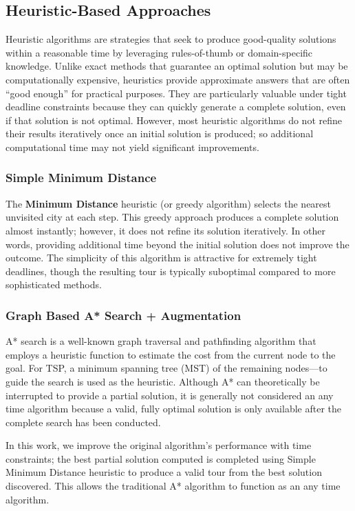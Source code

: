 \documentclass[11pt]{article}
\begin{document}
	\subsection{Heuristic-Based Approaches}
	Heuristic algorithms are strategies that seek to produce good-quality solutions within a reasonable time by leveraging rules-of-thumb or domain-specific knowledge. Unlike exact methods that guarantee an optimal solution but may be computationally expensive, heuristics provide approximate answers that are often “good enough” for practical purposes. They are particularly valuable under tight deadline constraints because they can quickly generate a complete solution, even if that solution is not optimal. However, most heuristic algorithms do not refine their results iteratively once an initial solution is produced; so additional computational time may not yield significant improvements.
	
	\subsubsection{Simple Minimum Distance}
	The \textbf{Minimum Distance} heuristic (or greedy algorithm) selects the nearest unvisited city at each step. This greedy approach produces a complete solution almost instantly; however, it does not refine its solution iteratively. In other words, providing additional time beyond the initial solution does not improve the outcome. The simplicity of this algorithm is attractive for extremely tight deadlines, though the resulting tour is typically suboptimal compared to more sophisticated methods.
	
	\subsubsection{Graph Based A* Search + Augmentation}
	A* search is a well-known graph traversal and pathfinding algorithm \cite{4082128} that employs a heuristic function to estimate the cost from the current node to the goal. For TSP, a minimum spanning tree (MST) of the remaining nodes—to guide the search is used as the heuristic. Although A* can theoretically be interrupted to provide a partial solution, it is generally not considered an any time algorithm because a valid, fully optimal solution is only available after the complete search has been conducted. 
	
	In this work, we improve the original algorithm's performance with time constraints; the best partial solution computed is completed using Simple Minimum Distance heuristic to produce a valid tour from the best solution discovered. This allows the traditional A* algorithm to function as an any time algorithm.
	
\end{document}
